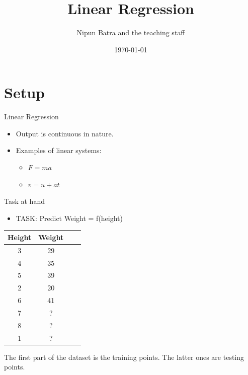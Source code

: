 \documentclass{beamer}
\title{Linear Regression}
\date{\today}
\author{Nipun Batra and the teaching staff}
\institute{IIT Gandhinagar}
\begin{document}
  \maketitle
  

\section{Setup}
  

\begin{frame}{Linear Regression}
\begin{itemize}
	
	
	\item<+-> Output is continuous in nature.
	\item<+-> Examples of linear systems:
	\begin{itemize}
		\item<+-> $F=ma$
		\item<+-> $v=u+at$
	\end{itemize}
	
\end{itemize}
\end{frame}

\begin{frame}{Task at hand}
\begin{itemize}

\item TASK: Predict Weight = f(height)
\end{itemize}
\begin{center}
    

\begin{tabular}{ |c|c|c|c| } 
\hline
 Height & Weight \\
\hline
3 & 29 \\ 
4 & 35 \\ 
5 & 39\\
2 & 20\\
6 & 41\\
\hline
\hline
7 & ?\\
8 & ?\\
1 &? \\
\hline
\end{tabular}

\end{center}
The first part of the dataset is the training points. The latter ones are testing points.	

\end{frame}
\end{document}
